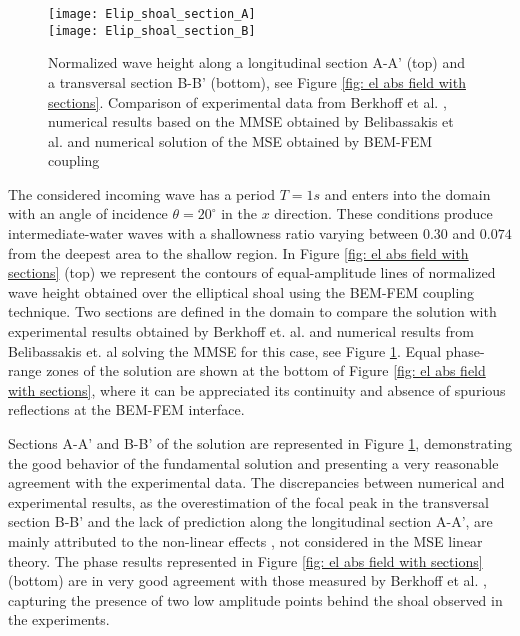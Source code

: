 \begin{figure}
\begin{center}
\texttt{[image: Elip\_shoal\_section\_A]} \\
\texttt{[image: Elip\_shoal\_section\_B]}
\caption{Normalized wave height along a longitudinal section A-A' (top) and a transversal section B-B' (bottom), see Figure \ref{fig: el abs field with sections}. Comparison of experimental data from Berkhoff et al. \cite{Berkhoff1982}, numerical results based on the MMSE obtained by Belibassakis et al. \cite{Belibassakis2001} and numerical solution of the MSE obtained by BEM-FEM coupling}
\label{fig: sections AB}
\end{center}
\end{figure}

The considered incoming wave has a period $T=1s$ and enters into the domain with an angle of incidence $\theta=20^{\circ}$ in the $x$ direction. These conditions produce intermediate-water waves with a shallowness ratio varying between $0.30$ and $0.074$ from the deepest area to the shallow region. In Figure \ref{fig: el abs field with sections} (top) we represent the contours of equal-amplitude lines of normalized wave height obtained over the elliptical shoal using the BEM-FEM coupling technique. Two sections are defined in the domain to compare the solution with experimental results obtained by Berkhoff et. al. \cite{Berkhoff1982} and numerical results from Belibassakis et. al \cite{Belibassakis2001} solving the MMSE for this case, see Figure \ref{fig: sections AB}.  Equal phase-range zones of the solution are shown at the bottom of Figure \ref{fig: el abs field with sections}, where it can be appreciated its continuity and absence of spurious reflections at the BEM-FEM interface. 

Sections A-A' and B-B' of the solution are represented in Figure \ref{fig: sections AB}, demonstrating the good behavior of the fundamental solution and presenting a very reasonable agreement with the experimental data. The discrepancies between numerical and experimental results, as the overestimation of the focal peak in the transversal section B-B' and the lack of prediction along the longitudinal section A-A', are mainly attributed to the non-linear effects  \cite{Belibassakis2001}, not considered in the MSE linear theory. The phase results represented in Figure \ref{fig: el abs field with sections} (bottom) are in very good agreement with those measured by Berkhoff et al. \cite{Berkhoff1982}, capturing the presence of two low amplitude points behind the shoal observed in the experiments.

